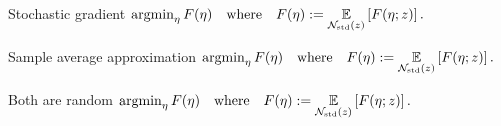 \documentclass[8pt]{beamer}\usepackage[]{graphicx}\usepackage[]{color}
\begin{document}
\begin{frame}{Stochastic gradient}
    $\operatorname*{\mathrm{argmin}}_{\eta} F(\eta) \quad\textrm{where}\quad F(\eta) := \underset{\mathcal{N}_{\mathrm{std}}\left(z\right)}{\mathbb{E}}\left[F(\eta; z)\right].$
    \vspace{2em}
  \centering
\end{frame}

\begin{frame}{Sample average approximation}
    $\operatorname*{\mathrm{argmin}}_{\eta} F(\eta) \quad\textrm{where}\quad F(\eta) := \underset{\mathcal{N}_{\mathrm{std}}\left(z\right)}{\mathbb{E}}\left[F(\eta; z)\right].$
    \vspace{2em}
  \centering
\end{frame}

\begin{frame}{Both are random}
    $\operatorname*{\mathrm{argmin}}_{\eta} F(\eta) \quad\textrm{where}\quad F(\eta) := \underset{\mathcal{N}_{\mathrm{std}}\left(z\right)}{\mathbb{E}}\left[F(\eta; z)\right].$
    \vspace{2em}
  \centering
\end{frame}

    

\end{document}
